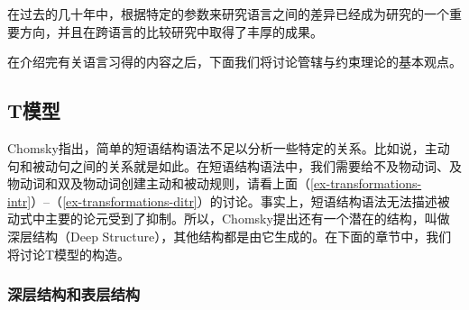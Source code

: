 在过去的几十年中，根据特定的参数来研究语言之间的差异已经成为研究的一个重要方向，并且在跨语言的比较研究中取得了丰厚的成果。

在介绍完有关语言习得的内容之后，下面我们将讨论管辖与约束理论的基本观点。

\subsection{T模型}
\label{Abschnitt-T-Modell}

Chomsky指出，简单的短语结构语法不足以分析一些特定的关系。比如说，主动句和被动句之间的关系就是如此。在短语结构语法中，我们需要给不及物动词、及物动词和双及物动词创建主动和被动规则，请看上面（\ref{ex-transformations-intr}）--（\ref{ex-transformations-ditr}）的讨论。事实上，短语结构语法无法描述被动式中主要的论元受到了抑制。所以，Chomsky提出还有一个潜在的结构，叫做深层结构（Deep Structure），其他结构都是由它生成的。在下面的章节中，我们将讨论T模型的构造。

\subsubsection{深层结构和表层结构}

